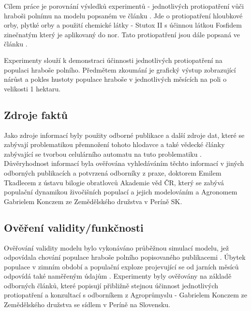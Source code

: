 \documentclass[a4paper,11pt]{article}
\begin{document}
Cílem práce je porovnání výsledků experimentů - jednotlivých protiopatření vůči hraboši polnímu na modelu popsaném ve článku \cite{OurCA}. Jde o protiopatření hloubkové orby, plytké orby a použití chemické látky - Stutox II s účinnou látkou Fosfidem zinečnatým který je aplikovaný do nor. Tato protiopatření jsou dále popsaná ve článku \cite{ochrana}.

Experimenty slouží k demonstraci účinnosti jednotlivých protiopatření na populaci hraboše polního. Předmětem zkoumání je grafický výstup zobrazující nárůst  a  pokles hustoty populace hraboše v jednotlivých měsících na poli o velikosti 1 hektaru. 

\subsection{Zdroje faktů}
Jako zdroje informací byly použity odborné publikace\cite{prubehvyvoje} a další zdroje dat\cite{letak}, které se zabývají problematikou přemnožení tohoto hlodavce a také vědecké články zabývající se tvorbou celulárního automatu na tuto problematiku \cite{OurCA}. Důvěryhodnost informací byla ověřována vyhledáváním těchto informací v jiných odborných publikacích \cite{fluktuace} \cite{prubehvyvoje} a potvrzená odborníky z praxe, doktorem Emilem Tkadlecem z ústavu bilogie obratlovců Akademie věd ČR, který se zabývá populační dynamikou živočišních populací a jejich modelováním a Agronomem Gabrielem Konczem ze Zemědělského družstva v Períně SK.

\subsection{Ověření validity/funkčnosti}
Ověřování validity modelu bylo vykonáváno průběžnou simulací modelu, jež odpovídala chování populace hraboše polního popisovaného publikacemi \cite{letak}\cite{fluktuace}\cite{prubehvyvoje}\cite{Voles-popul-data:online}\cite{diplom-Tkadlec}. Úbytek populace v zimním období a populační exploze projevující se od jarních měsíců odpovídá také naměřeným údajům \cite{Winter-temp:online}. Experimenty byly ověřovány na základě odborných článků, které popisují přibližně stejnou účinnost jednotlivých protiopatření a konzultací s odborníkem z Agroprůmyslu - Gabrielem Konczem ze Zemědělského družstva se sídlem v Períně na Slovensku.   
\end{document}
